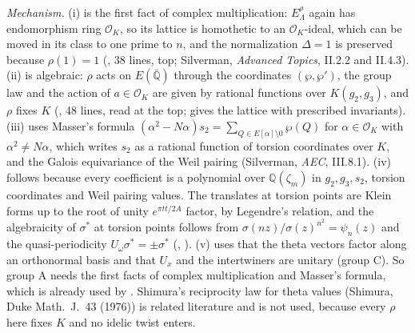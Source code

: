\documentclass[11pt]{article}
\theoremstyle{remark}
\begin{document}
\noindent\emph{Mechanism.} (i) is the first fact of complex multiplication: $E_\Lambda^\rho$ again has endomorphism ring $\mathcal O_K$, so its lattice is homothetic to an $\mathcal O_K$-ideal, which can be moved in its class to one prime to $n$, and the normalization $\Delta=1$ is preserved because $\rho(1)=1$ (, 38 lines, top; Silverman, \emph{Advanced Topics}, II.2.2 and II.4.3). (ii) is algebraic: $\rho$ acts on $E(\bar{\mathbb Q})$ through the coordinates $(\wp,\wp')$, the group law and the action of $a\in\mathcal O_K$ are given by rational functions over $K(g_2,g_3)$, and $\rho$ fixes $K$ (, 48 lines, read at the top;  gives the lattice with prescribed invariants). (iii) uses Masser's formula $(\alpha^2-N\alpha)s_2=\sum_{Q\in E[\alpha]\setminus0}\wp(Q)$ for $\alpha\in\mathcal O_K$ with $\alpha^2\ne N\alpha$, which writes $s_2$ as a rational function of torsion coordinates over $K$, and the Galois equivariance of the Weil pairing (Silverman, \emph{AEC}, III.8.1). (iv) follows because every coefficient is a polynomial over $\mathbb Q(\zeta_m)$ in $g_2,g_3,s_2$, torsion coordinates and Weil pairing values. The translates at torsion points are Klein forms up to the root of unity $e^{\pi t\bar t/2A}$ factor, by Legendre's relation, and the algebraicity of $\sigma^*$ at torsion points follows from $\sigma(nz)/\sigma(z)^{n^2}=\psi_n(z)$ and the quasi-periodicity $U_\omega\sigma^*=\pm\sigma^*$ (, ). (v) uses that the theta vectors factor along an orthonormal basis and that $U_x$ and the intertwiners are unitary (group C). So group A needs the first facts of complex multiplication and Masser's formula, which is already used by . Shimura's reciprocity law for theta values (Shimura, Duke Math.\ J.\ 43 (1976)) is related literature and is not used, because every $\rho$ here fixes $K$ and no idelic twist enters.
\end{document}
